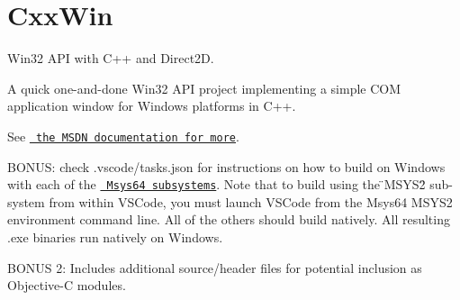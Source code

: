 \chapter{Cxx\+Win}
\hypertarget{index}{}\label{index}
\label{index_md__r_e_a_d_m_e}%
%
 Win32 API with C++ and Direct2D.

A quick one-\/and-\/done Win32 API project implementing a simple COM application window for Windows platforms in C++.



See \href{https://learn.microsoft.com/en-us/windows/win32/learnwin32/introduction-to-windows-programming-in-c--}{\texttt{ the MSDN documentation for more}}.

BONUS\+: check \textquotesingle{}.vscode/tasks.\+json\textquotesingle{} for instructions on how to build on Windows with each of the \href{https://www.msys2.org/docs/environments/}{\texttt{ Msys64 subsystems}}. Note that to build using the \"{}\+MSYS2\"{} sub-\/system from within VSCode, you must launch VSCode from the Msys64 MSYS2 environment command line. All of the others should build natively. All resulting \textquotesingle{}.exe\textquotesingle{} binaries run natively on Windows.

BONUS 2\+: Includes additional source/header files for potential inclusion as Objective-\/C \textquotesingle{}modules\textquotesingle{}. 